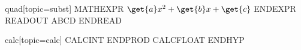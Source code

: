 %

\begin{problem}{quad}[topic=subst]
	MATHEXPR $\get{a}x^2 + \get{b}x + \get{c}$ ENDEXPR
	READOUT ABCD ENDREAD
\end{problem}

\begin{problem}{calc}[topic=calc]
	CALCINT  ENDPROD
	CALCFLOAT  ENDHYP
\end{problem}

